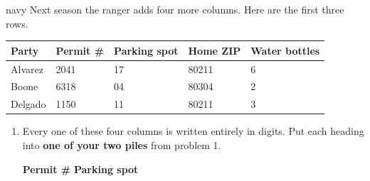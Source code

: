 \boxguard[16]
\begin{scenariobox}{navy}
Next season the ranger adds four more columns. Here are the first three rows.

\vspace{4pt}
\small
\renewcommand{\arraystretch}{1.12}
\begin{tabularx}{\linewidth}{@{} l Y Y Y Y @{}}
\textbf{Party} & \textbf{Permit \#} & \textbf{Parking spot} & \textbf{Home ZIP} &
\textbf{Water bottles} \\
\hline
Alvarez & 2041 & 17 & 80211 & 6 \\
Boone   & 6318 & 04 & 80304 & 2 \\
Delgado & 1150 & 11 & 80211 & 3 \\
\hline
\end{tabularx}

\normalsize
\begin{enumerate}[label=\textbf{\alph*.}, leftmargin=1.8em, itemsep=6pt]
  \item Every one of these four columns is written entirely in digits. Put each heading into
        \textbf{one of your two piles} from problem 1.

        \vspace{2pt}

        \textbf{Permit \#}  \hfill \textbf{Parking spot} 


\end{enumerate}
\end{scenariobox}
